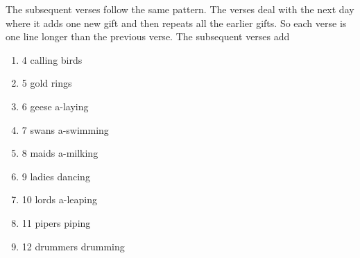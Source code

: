 \documentclass{article}
\theoremstyle{definition}
\begin{document}
\smallskip
\noindent
The subsequent verses follow the same pattern. The verses deal
with the next day where it adds one new gift and then repeats all
the earlier gifts. So each verse is one line longer than the
previous verse. The subsequent verses add

\vspace{0.375em}
 \begin{enumerate}
   \addtocounter{enumi}{3}                                                                      %
   \item 4 calling birds
   \item 5 gold rings
   \item 6 geese a-laying
   \item 7 swans a-swimming
   \item 8 maids a-milking
   \item 9 ladies dancing
   \item 10 lords a-leaping
   \item 11 pipers piping
   \item 12 drummers drumming
 \end{enumerate}
\end{document}
